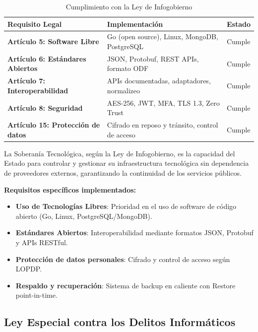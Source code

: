 \begin{table}[H]
\centering
\caption{Cumplimiento con la Ley de Infogobierno}
\begin{tabular}{|l|p{7cm}|p{3.5cm}|}
\hline
\textbf{Requisito Legal} & \textbf{Implementación} & \textbf{Estado} \\ \hline
\textbf{Artículo 5: Software Libre} & Go (open source), Linux, MongoDB, PostgreSQL & Cumple \\ \hline
\textbf{Artículo 6: Estándares Abiertos} & JSON, Protobuf, REST APIs, formato ODF & Cumple \\ \hline
\textbf{Artículo 7: Interoperabilidad} & APIs documentadas, adaptadores, normalizeo & Cumple \\ \hline
\textbf{Artículo 8: Seguridad} & AES-256, JWT, MFA, TLS 1.3, Zero Trust & Cumple \\ \hline
\textbf{Artículo 15: Protección de datos} & Cifrado en reposo y tránsito, control de acceso & Cumple \\ \hline
\end{tabular}
\end{table}

\begin{definicion}
La Soberanía Tecnológica, según la Ley de Infogobierno, es la capacidad del Estado para controlar y gestionar su infraestructura tecnológica sin dependencia de proveedores externos, garantizando la continuidad de los servicios públicos.
\end{definicion}

\textbf{Requisitos específicos implementados:}

\begin{itemize}
\item \textbf{Uso de Tecnologías Libres}: Prioridad en el uso de software de código abierto (Go, Linux, PostgreSQL/MongoDB).
\item \textbf{Estándares Abiertos}: Interoperabilidad mediante formatos JSON, Protobuf y APIs RESTful.
\item \textbf{Protección de datos personales}: Cifrado y control de acceso según LOPDP.
\item \textbf{Respaldo y recuperación}: Sistema de backup en caliente con Restore point-in-time.
\end{itemize}

\subsection{Ley Especial contra los Delitos Informáticos}

